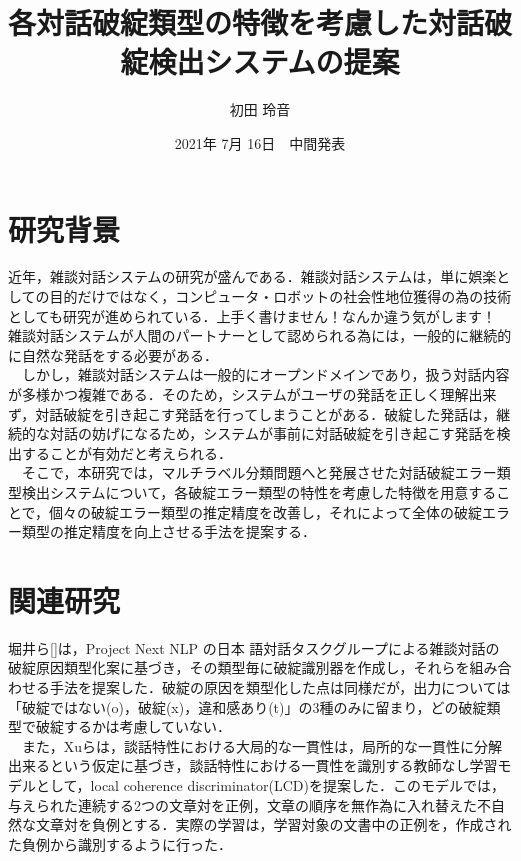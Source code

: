 \documentclass[upLaTex, 10pt,dvipdfmx,a4paper,twocolumn]{jsarticle}
\begin{document}
\title{各対話破綻類型の特徴を考慮した対話破綻検出システムの提案}
\author{初田 玲音}
\date{2021年 7月 16日　中間発表}


\maketitle

\section{研究背景}
    近年，雑談対話システムの研究が盛んである．雑談対話システムは，単に娯楽としての目的だけではなく，コンピュータ・ロボットの社会性地位獲得の為の技術としても研究が進められている．上手く書けません！なんか違う気がします！　雑談対話システムが人間のパートナーとして認められる為には，一般的に継続的に自然な発話をする必要がある．\\
    　しかし，雑談対話システムは一般的にオープンドメインであり，扱う対話内容が多様かつ複雑である．そのため，システムがユーザの発話を正しく理解出来ず，対話破綻を引き起こす発話を行ってしまうことがある．破綻した発話は，継続的な対話の妨げになるため，システムが事前に対話破綻を引き起こす発話を検出することが有効だと考えられる．\\
    　そこで，本研究では，マルチラベル分類問題へと発展させた対話破綻エラー類型検出システムについて，各破綻エラー類型の特性を考慮した特徴を用意することで，個々の破綻エラー類型の推定精度を改善し，それによって全体の破綻エラー類型の推定精度を向上させる手法を提案する．

\section{関連研究}
    堀井ら[]は，Project Next NLP の日本
    語対話タスクグループによる雑談対話の破綻原因類型化案に基づき，その類型毎に破綻識別器を作成し，それらを組み合わせる手法を提案した．破綻の原因を類型化した点は同様だが，出力については「破綻ではない(o)，破綻(x)，違和感あり(t)」の3種のみに留まり，どの破綻類型で破綻するかは考慮していない．\\
    　また，Xuらは，談話特性における大局的な一貫性は，局所的な一貫性に分解出来るという仮定に基づき，談話特性における一貫性を識別する教師なし学習モデルとして，local coherence discriminator(LCD)を提案した．このモデルでは，与えられた連続する2つの文章対を正例，文章の順序を無作為に入れ替えた不自然な文章対を負例とする．実際の学習は，学習対象の文書中の正例を，作成された負例から識別するように行った．
    
\end{document}
